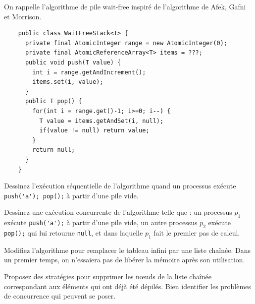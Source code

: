 
\begingroup

\begin{exercice}

  On rappelle l'algorithme de pile wait-free inspiré de l'algorithme de Afek, Gafni et Morrison. 
  
  \begin{lstlisting}
    public class WaitFreeStack<T> {
      private final AtomicInteger range = new AtomicInteger(0);
      private final AtomicReferenceArray<T> items = ???;
      public void push(T value) {
        int i = range.getAndIncrement();
        items.set(i, value);
      }
      public T pop() {
        for(int i = range.get()-1; i>=0; i--) {
          T value = items.getAndSet(i, null);
          if(value != null) return value;
        }
        return null;
      }
    }
  \end{lstlisting}

  \begin{questions}
  \item Dessinez l'exécution séquentielle de l'algorithme quand un processus exécute \lstinline{push('a'); pop();} à partir d'une pile vide.
  \item Dessinez une exécution concurrente de l'algorithme telle que : un processus $p_1$ exécute \lstinline{push('a');} à partir d'une pile vide,
    un autre processus $p_2$ exécute \lstinline{pop();} qui lui retourne \lstinline{null}, et dans laquelle $p_1$ fait le premier pas de calcul.
  \item Modifiez l'algorithme pour remplacer le tableau infini par une liste chaînée.
    Dans un premier temps, on n'essaiera pas de libérer la mémoire après son utilisation.
  \item Proposez des stratégies pour supprimer les n\oe uds de la liste chaînée correspondant aux éléments qui ont déjà été dépilés.
    Bien identifier les problèmes de concurrence qui peuvent se poser. 
  \end{questions}

\end{exercice}

\endgroup
\endinput
